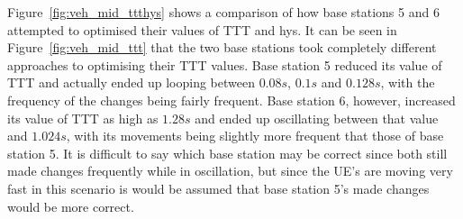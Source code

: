 Figure~\ref{fig:veh_mid_ttthys} shows a comparison of how base stations 5 and 6 attempted to optimised their values of TTT and hys. It can be seen in Figure~\ref{fig:veh_mid_ttt} that the two base stations took completely different approaches to optimising their TTT values. Base station 5 reduced its value of TTT and actually ended up looping between $0.08 s$, $0.1 s$ and $0.128 s$, with the frequency of the changes being fairly frequent. Base station 6, however, increased its value of TTT as high as $1.28 s$ and ended up oscillating between that value and $1.024 s$, with its movements being slightly more frequent that those of base station 5. It is difficult to say which base station may be correct since both still made changes frequently while in oscillation, but since the UE’s are moving very fast in this scenario is would be assumed that base station 5’s made changes would be more correct.

